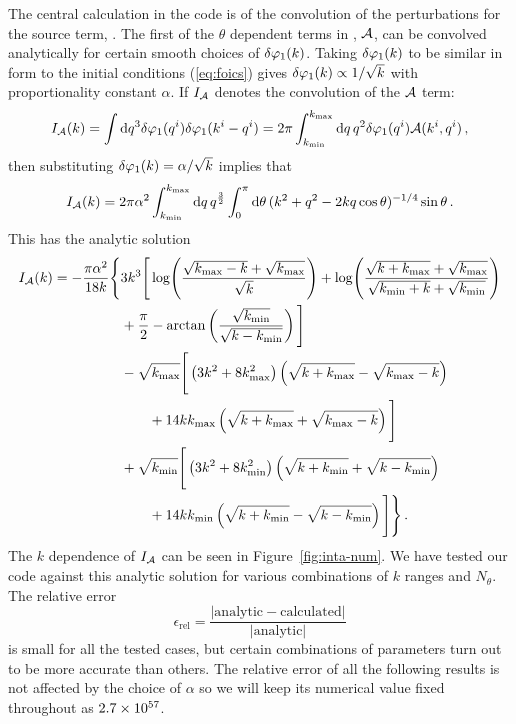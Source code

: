The central calculation in the code is of the
convolution of the perturbations for the source term,
. The first of the $\theta$ dependent terms in
, $\mathcal{A}$,
can be convolved analytically for certain smooth choices of $\delta\varphi_{1}(k)$. 
Taking $\delta\varphi_{1}(k)$ to be similar in form to the initial conditions
(\ref{eq:foics}) gives $\delta\varphi_{1}(k)\propto 1/\sqrt{k}$ with proportionality constant
$\alpha$.
If $I_{\mathcal{A}}$ denotes the convolution of the $\mathcal{A}$ term:
% 
\begin{equation}
 I_{\mathcal{A}} (k) = \int \mathrm{d} q^3 \delta\varphi_{1}(q^i) \delta\varphi_{1}(k^i-q^i) 
          = 2\pi \int_{k_{\mathrm{min}}}^{k_{\mathrm{max}}} \mathrm{d} q\, q^2 \delta\varphi_{1}(q^i) \mathcal{A}(k^i, q^i)\,,
\end{equation}
% 
then substituting $\delta\varphi_{1}(k) = \alpha/\sqrt{k}$ implies that
% 
\begin{equation}
 I_{\mathcal{A}}(k) = 2\pi\alpha^2 \int_{k_{\mathrm{min}}}^{k_{\mathrm{max}}} \mathrm{d} q\, q^{\frac{3}{2}}
\int_{0}^{\pi} \mathrm{d}\theta\, (k^2 + q^2 -2k q \cos{\theta})^{-1/4} \sin{\theta}\,. 
\end{equation}
% 
This has the analytic solution
% 
\begin{align}
\label{eq:err-analytic-num}
 I_\A(k) = -\frac{\pi\alpha^2}{18 k}\Bigg\{ 
	&3 k^3 \Bigg[ \log\Biggl(\frac{\sqrt{\kmax-k} + \sqrt{\kmax}}{\sqrt{k}}
			    \Biggr)
	 + \log\Biggl( \frac{\sqrt{k+\kmax} +\sqrt{\kmax}}{\sqrt{\kmin+k} +
		      \sqrt{\kmin}}\Biggr) \nonumber \\
	&+\frac{\pi}{2} - \arctan\left( \frac{\sqrt{\kmin}}{\sqrt{k-\kmin}}\right)
	\Bigg] \nonumber\\
% 
        &-\sqrt{\kmax}\Bigg[ \left(3k^2 + 8\kmax^2 \right)\left(\sqrt{k+\kmax} -
	  \sqrt{\kmax-k}\right) \nonumber \\
	&\qquad + 14k\kmax\left(\sqrt{k+\kmax}+\sqrt{\kmax-k}\right)\Bigg]\nonumber\\
% 
	&+\sqrt{\kmin}\Bigg[ \left(3k^2 + 8\kmin^2 \right)\left(\sqrt{k+\kmin} +
	  \sqrt{k-\kmin}\right) \nonumber \\
	&\qquad +14k\kmin \left(\sqrt{k+\kmin} -
         \sqrt{k-\kmin} \right) \Bigg] \Bigg\} \,.
\end{align}
% 
% 
% 
The $k$ dependence of $I_{\mathcal{A}}$ can be seen in Figure~\ref{fig:inta-num}. 
We have tested our code against this analytic solution for various
combinations of $k$ ranges and $N_\theta$. The relative error
%
\begin{equation}
 \epsilon_\mathrm{rel} = \frac{|\mathrm{analytic}- \mathrm{calculated}
|}{|\mathrm{analytic}|}
\end{equation}
%
is small for all the tested cases, but certain combinations of
parameters turn out to be more accurate than others. The relative error of
all the following results is not affected by the choice of $\alpha$ so
we will keep its numerical value fixed throughout as $2.7\times 10^{57}$.

